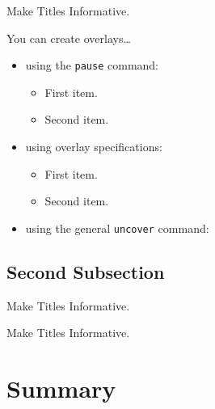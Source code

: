 \documentclass[portuges]{beamer}
\begin{document}
\begin{frame}{Make Titles Informative.}

  You can create overlays\dots
  \begin{itemize}
  \item using the \texttt{pause} command:
    \begin{itemize}
    \item
      First item.
      \pause
    \item    
      Second item.
    \end{itemize}
  \item
    using overlay specifications:
    \begin{itemize}
    \item<3->
      First item.
    \item<4->
      Second item.
    \end{itemize}
  \item
    using the general \texttt{uncover} command:
    \begin{itemize}
    \end{itemize}
  \end{itemize}
\end{frame}


\subsection{Second Subsection}

\begin{frame}{Make Titles Informative.}
\end{frame}

\begin{frame}{Make Titles Informative.}
\end{frame}



\section*{Summary}
\end{document}
